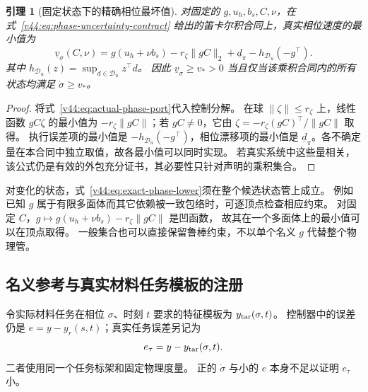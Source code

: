 \documentclass[11pt,a4paper]{article}
\numberwithin{equation}{section}
\newtheorem{lemma}[theorem]{引理}
\theoremstyle{definition}
\begin{document}
\begin{lemma}[固定状态下的精确相位最坏值]
\label{v44:lem:phase-support}
对固定的 $g,u_h,b_s,C,\nu$，在式~\eqref{v44:eq:phase-uncertainty-contract}
给出的笛卡尔积合同上，真实相位速度的最小值为
\begin{equation}
 \boxed{\underline v_\sigma(C,\nu)
  =g(u_h+\nu b_s)-r_\zeta\|gC\|_2
   +\underline d_\pi-h_{\mathcal D_u}(-g^\top).}
 \label{v44:eq:exact-phase-lower}
\end{equation}
其中 $h_{\mathcal D_u}(z)=\sup_{d\in\mathcal D_u}z^\top d$。
因此 $\underline v_\sigma\ge v_*>0$ 当且仅当该乘积合同内的所有状态均满足
$\dot\sigma\ge v_*$。
\end{lemma}
\begin{proof}
将式~\eqref{v44:eq:actual-phase-port}代入控制分解。
在球 $\|\zeta\|\le r_\zeta$ 上，线性函数 $gC\zeta$ 的最小值为
$-r_\zeta\|gC\|$；若 $gC\ne0$，它由
$\zeta=-r_\zeta(gC)^\top/\|gC\|$ 取得。
执行误差项的最小值是 $-h_{\mathcal D_u}(-g^\top)$，相位漂移项的最小值是
$\underline d_\pi$。各不确定量在本合同中独立取值，故各最小值可以同时实现。
若真实系统中这些量相关，该公式仍是有效的外包充分证书，其必要性只针对声明的乘积集合。
\end{proof}

对变化的状态，式~\eqref{v44:eq:exact-phase-lower}须在整个候选状态管上成立。
例如已知 $g$ 属于有限多面体而其它依赖被一致包络时，可逐顶点检查相应约束。
对固定 $C$，$g\mapsto g(u_h+\nu b_s)-r_\zeta\|gC\|$ 是凹函数，
故其在一个多面体上的最小值可以在顶点取得。
一般集合也可以直接保留鲁棒约束，不以单个名义 $g$ 代替整个物理管。

\subsection{名义参考与真实材料任务模板的注册}
令实际材料任务在相位 $\sigma$、时刻 $t$ 要求的特征模板为
$y_{\rm tar}(\sigma,t)$。
控制器中的误差仍是 $e=y-y_r(s,t)$；真实任务误差另记为
\begin{equation}
 e_\tau=y-y_{\rm tar}(\sigma,t).
 \label{v44:eq:actual-template-error}
\end{equation}
二者使用同一个任务标架和固定物理度量。
正的 $\dot\sigma$ 与小的 $e$ 本身不足以证明 $e_\tau$ 小。
\end{document}
